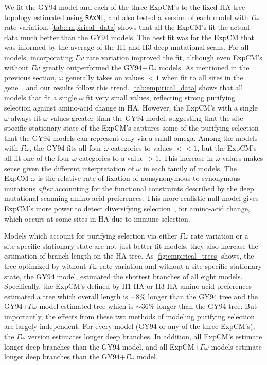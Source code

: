 \documentclass[11pt]{article}
\begin{document}
We fit the GY94 model and each of the three ExpCM's to the fixed HA tree topology estimated using \texttt{RAxML}, and also tested a version of each model with $\Gamma\omega$ rate variation.
\ref{tab:empirical_data} shows that all the ExpCM's fit the actual data much better than the GY94 models.
The best fit was for the ExpCM that was informed by the average of the H1 and H3 deep mutational scans.
For all models, incorporating $\Gamma\omega$ rate variation improved the fit, although even ExpCM's without $\Gamma\omega$ greatly outperformed the GY94+$\Gamma\omega$ models.
As mentioned in the previous section, $\omega$ generally takes on values $<1$ when fit to all sites in the gene~\citep{murrell2015gene}, and our results follow this trend. 
\ref{tab:empirical_data} shows that all models that fit a single $\omega$ fit very small values, reflecting strong purifying selection against amino-acid change in HA. 
However, the ExpCM's with a single $\omega$ always fit $\omega$ values greater than the GY94 model, suggesting that the site-specific stationary state of the ExpCM's captures some of the purifying selection that the GY94 models can represent only via a small omega.
Among the models with $\Gamma\omega$, the GY94 fits all four $\omega$ categories to values $<< 1$, but the ExpCM's all fit one of the four $\omega$ categories to a value $>1$.
This increase in $\omega$ values makes sense given the different interpretation of $\omega$ in each family of models. 
The ExpCM $\omega$ is the relative rate of fixation of nonsynonymous to synonymous mutations \textit{after} accounting for the functional constraints described by the deep mutational scanning amino-acid preferences.
This more realistic null model gives ExpCM's more power to detect diversifying selection~\citep{bloom2017identification, rodrigue2016detecting}, for amino-acid change, which occurs at some sites in HA due to immune selection.

Models which account for purifying selection via either $\Gamma\omega$ rate variation or a site-specific stationary state are not just better fit models, they also increase the estimation of branch length on the HA tree. 
As \ref{fig:empirical_trees} shows, the tree optimized by without $\Gamma\omega$ rate variation and without a site-specific stationary state, the GY94 model, estimated the shortest branches of all eight models. 
Specifically, the ExpCM's defined by H1 HA or H3 HA amino-acid preferences estimated a tree which overall length is $\sim 8\%$ longer than the GY94 tree and the GY94+$\Gamma\omega$ model estimated tree which is $\sim 36\%$ longer than the GY94 tree. 
But importantly, the effects from these two methods of modeling purifying selection are largely independent.
For every model (GY94 or any of the three ExpCM's), the $\Gamma\omega$ version estimates longer deep branches.
In addition, all ExpCM's estimate longer deep branches than the GY94 model, and all ExpCM+$\Gamma\omega$ models estimate longer deep branches than the GY94+$\Gamma\omega$ model.
\end{document}
